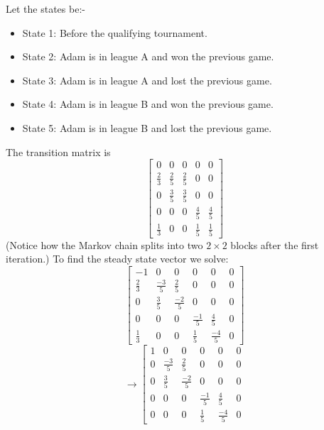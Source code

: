 \documentclass{article}
\begin{document}
\begin{Answer}
  Let the states be:-
  \begin{itemize}
    \item State 1: Before the qualifying tournament.
    \item State 2: Adam is in league A and won the previous game.
    \item State 3: Adam is in league A and lost the previous game.
    \item State 4: Adam is in league B and won the previous game.
    \item State 5: Adam is in league B and lost the previous game.
  \end{itemize}
  The transition matrix is 
  \begin{equation*}
  \left[
  \begin{array}{ccccc}
  0&0&0&0&0\\
  \frac{2}{3} & \frac{2}{5} & \frac{2}{5} & 0&0\\
  0 & \frac{3}{5} & \frac{3}{5} & 0 & 0\\
  0&0&0 &\frac{4}{5} & \frac{4}{5}\\
  \frac{1}{3} & 0 & 0 & \frac{1}{5} & \frac{1}{5}
  \end{array}
  \right]
  \end{equation*}
  (Notice how the Markov chain splits into two $2\times 2$ blocks after the first iteration.)
  To find the steady state vector we solve:
  \begin{equation*}
  \left[
  \begin{array}{ccccc|c}
  -1&0&0&0&0&0\\
  \frac{2}{3} & \frac{-3}{5} & \frac{2}{5} & 0&0&0\\
  0 & \frac{3}{5} & \frac{-2}{5} & 0 & 0&0\\
  0&0&0 &\frac{-1}{5} & \frac{4}{5}&0\\
  \frac{1}{3} & 0 & 0 & \frac{1}{5} & \frac{-4}{5}&0
  \end{array}
  \right]
  \end{equation*}
  \begin{equation*}
  \rightarrow\left[
  \begin{array}{ccccc|c}
  1&0&0&0&0&0\\
  0 & \frac{-3}{5} & \frac{2}{5} & 0&0&0\\
  0 & \frac{3}{5} & \frac{-2}{5} & 0 & 0&0\\
  0&0&0 &\frac{-1}{5} & \frac{4}{5}&0\\
  0 & 0 & 0 & \frac{1}{5} & \frac{-4}{5}&0
  \end{array}

\end{equation*}
\end{Answer}
\end{document}
